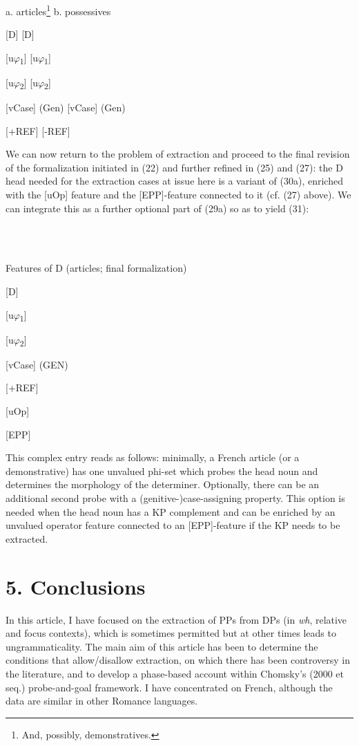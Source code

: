 \documentclass[output=paper]{langsci/langscibook}
\begin{document}
          a.   articles\footnote{And, possibly, demonstratives.}    b.  possessives

    [D]        [D]

    [u$\varphi $\textsubscript{1}]          [u$\varphi $\textsubscript{1}]

    [u$\varphi $\textsubscript{2}]          [u$\varphi $\textsubscript{2}]

            [vCase] (Gen)     [vCase] (Gen)

           [+REF]      [-REF]

We can now return to the problem of extraction and proceed to the final revision of the formalization initiated in (22) and further refined in (25) and (27): the D head needed for the extraction cases at issue here is a variant of (30a), enriched with the [uOp] feature and the [EPP]-feature connected to it (cf. (27) above). We can integrate this as a further optional part of (29a) so as to yield (31):

\ea%
    \label{ex:key:31}
    \gll\\
        \\
    \glt
    \z

            Features of D (articles; final formalization)

       [D]

        [u$\varphi $\textsubscript{1}]

      [u$\varphi $\textsubscript{2}]

               [vCase] (GEN)

               [+REF]

            [uOp]

          {\textbar}

           [EPP]

This complex entry reads as follows: minimally, a French article (or a demonstrative) has one unvalued phi-set which probes the head noun and determines the morphology of the determiner. Optionally, there can be an additional second probe with a (genitive-)case-assigning property. This option is needed when the head noun has a KP complement and can be enriched by an unvalued operator feature connected to an [EPP]-feature if the KP needs to be extracted.

\section{ 5. Conclusions}

In this article, I have focused on the extraction of PPs from DPs (in \textit{wh}, relative and focus contexts), which is sometimes permitted but at other times leads to ungrammaticality. The main aim of this article has been to determine the conditions that allow/disallow extraction, on which there has been controversy in the literature, and to develop a phase-based account within Chomsky’s (2000 et seq.) probe-and-goal framework. I have concentrated on French, although the data are similar in other Romance languages.
\end{document}
